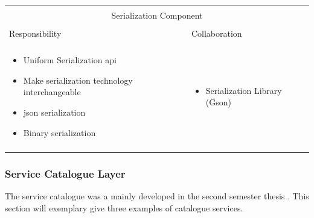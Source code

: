 \vspace{0.5cm} \noindent 
\begin{tabular}{|l|l|}
    \cline{1-2}
    \multicolumn{2}{|c|}{} \\[-0.3cm]
    \multicolumn{2}{|c|}{Serialization Component} \\ 
    \multicolumn{2}{|c|}{} \\[-0.3cm]
    \cline{1-2}
    Responsibility & Collaboration \\
    \cline{1-2}
    & \\[-0.2cm]
    \begin{minipage}{0.47\textwidth}
        \begin{itemize}
          \item Uniform Serialization \gls{api}
          \item Make serialization technology interchangeable
          \item \gls{json} serialization
          \item Binary serialization
        \end{itemize} 
    \end{minipage}
	&
    \begin{minipage}{0.47\textwidth}
        \begin{itemize}
          \item Serialization Library (Gson)
        \end{itemize} 
    \end{minipage}
	\\ & \\
    \hline
\end{tabular}

\subsubsection{Service Catalogue Layer}

The service catalogue was a mainly developed in the second semester thesis
. This section will exemplary give
three examples of catalogue services.\\

